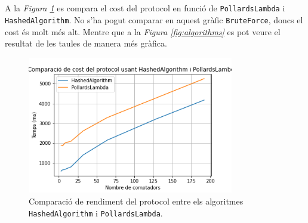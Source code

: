 \\
\\
 A la \textit{Figura \ref{fig:comparisons}} es compara el cost del protocol en funció de \texttt{PollardsLambda} i \texttt{HashedAlgorithm}. No s'ha pogut comparar en aquest gràfic \texttt{BruteForce}, doncs el cost és molt més alt.
 Mentre que a la \textit{Figura \ref{fig:algorithms}} es pot veure el resultat de les taules de manera més gràfica.
\begin{figure}[H]
	\centering
	\includegraphics[width=9cm]{imgs/cost/comp-hashed-pollards.png}
	\caption{Comparació de rendiment del protocol entre els algoritmes \texttt{HashedAlgorithm} i \texttt{PollardsLambda}.}
	\label{fig:comparisons}
\end{figure}
